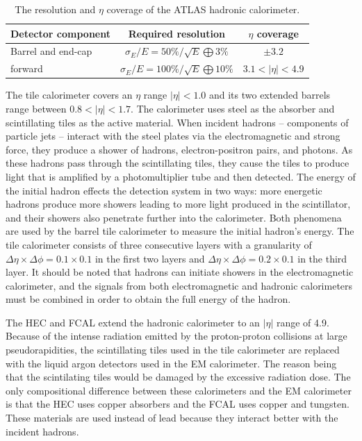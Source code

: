 \begin{table}[htbp]
  \begin{center}
    \caption{The resolution and $\eta$ coverage of the ATLAS hadronic calorimeter.}
    \label{tab:calres}
    \begin{tabular}{|l|c|c|}
    \hline
    Detector component & Required resolution & $\eta$ coverage  \\
    \hline
    Barrel and end-cap & $\sigma_E / E = 50\% / \sqrt{E} \bigoplus 3\%$ & $\pm3.2$ \\
    forward & $\sigma_E / E = 100\% / \sqrt{E} \bigoplus 10\%$ & $3.1 < |\eta| < 4.9$ \\
    \hline
    \end{tabular}
  \end{center}
\end{table}

The tile calorimeter covers an $\eta$ range $|\eta| < 1.0$ and its two
extended barrels range between $0.8 < |\eta| < 1.7$. The calorimeter uses steel
as the absorber and scintillating tiles as the active material. When
incident hadrons -- components of particle jets -- interact with the steel
plates via the electromagnetic and strong force, they produce a shower of hadrons,
electron-positron pairs, and photons. As these hadrons pass through the scintillating 
tiles, they cause the tiles to produce light that is amplified by a photomultiplier
tube and then detected. The energy of the initial hadron effects the detection
system in two ways: more energetic hadrons produce more showers leading to more
light produced in the scintillator, and their showers also penetrate further
into the calorimeter. Both phenomena are used by the barrel tile calorimeter
to measure the initial hadron's energy. The tile calorimeter consists of
three consecutive layers with a granularity of $\Delta\eta \times \Delta\phi =
0.1 \times 0.1$ in the first two layers and $\Delta\eta \times \Delta\phi =
0.2 \times 0.1$ in the third layer. It should be noted that hadrons can initiate
showers in the electromagnetic calorimeter, and the signals from both electromagnetic
and hadronic calorimeters must be combined in order to obtain the full energy of the
hadron.

The HEC and FCAL extend the hadronic calorimeter to an $|\eta|$ range of 4.9. 
Because of the intense radiation emitted by the proton-proton collisions at large
pseudorapidities, the scintillating tiles used in the tile calorimeter are replaced
with the liquid argon detectors used in the EM calorimeter. The reason being that
the scintilating tiles would be damaged by the excessive radiation dose.
The only compositional difference between 
these calorimeters and the EM calorimeter is that the HEC uses copper absorbers
and the FCAL uses copper and tungsten. These materials are used instead of lead
because they interact better with the incident hadrons.

